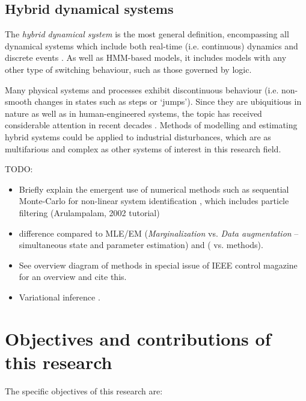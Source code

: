 \subsection{Hybrid dynamical systems}

The \textit{hybrid dynamical system} is the most general definition, encompassing all dynamical systems which include both real-time (i.e. continuous) dynamics and discrete events \citep{van_der_schaft_introduction_2000}. As well as HMM-based models, it includes models with any other type of switching behaviour, such as those governed by logic.

Many physical systems and processes exhibit discontinuous behaviour (i.e. non-smooth changes in states such as steps or ‘jumps’). Since they are ubiquitious in nature as well as in human-engineered systems, the topic has received considerable attention in recent decades \citep{sworder_boyd_1999, bemporad_identification_2001, costa_discrete-time_2005, camacho_model_2010, djemai_hybrid_2014, estrada_hybrid_2014, guo_moving_2013, botha_hybrid_2018, bemporad_fitting_2018, oliveira_iterative_2020, piga_estimation_2020}. Methods of modelling and estimating hybrid systems could be applied to industrial disturbances, which are as multifarious and complex as other systems of interest in this research field.

TODO:
\begin{itemize}
	\item Briefly explain the emergent use of numerical methods such as sequential Monte-Carlo for non-linear system identification \citep{schon_sequential_2015}, which includes particle filtering (Arulampalam, 2002 tutorial)
	\item difference compared to MLE/EM (\textit{Marginalization} vs. \textit{Data augmentation} – simultaneous state and parameter estimation) and ( vs.  methods).
	\item See overview diagram of methods in special issue of IEEE control magazine for an overview and cite this. \citep{wigren_nonlinear_2022}
	\item Variational inference \citep{ma_multiple-model_2019}.
\end{itemize}

\section{Objectives and contributions of this research}

The specific objectives of this research are:

